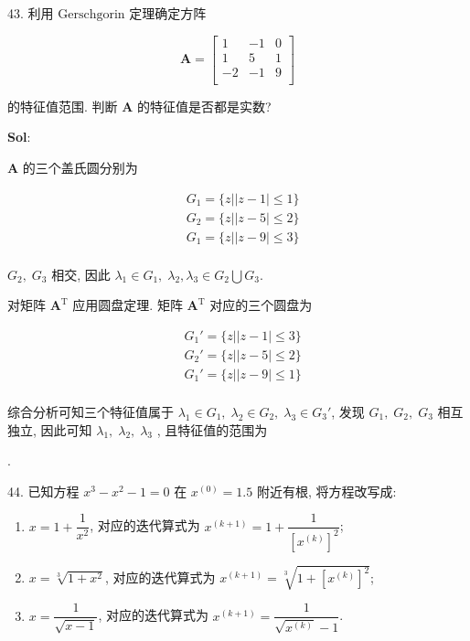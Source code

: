 

43. 利用 $\text{Gerschgorin}$ 定理确定方阵

$$
\textbf{A}=\begin{bmatrix}
    1&-1&0\\
    1&5&1\\
    -2&-1&9\\
\end{bmatrix}
$$

的特征值范围. 判断 $\textbf{A}$ 的特征值是否都是实数?

\textbf{Sol}:  

$\textbf{A}$ 的三个盖氏圆分别为

$$
\begin{aligned}
    &G_1=\{z|\mid z-1\mid \leqslant 1\}\\
    &G_2=\{z|\mid z-5\mid \leqslant 2\}\\
    &G_1=\{z|\mid z-9\mid \leqslant 3\}\\
\end{aligned}
$$

$G_2,\;G_3$ 相交, 因此 $\lambda_1\in G_1,\;\lambda_2,\lambda_3\in G_2\bigcup G_3$.

对矩阵 $\textbf{A}^{\text{T}}$ 应用圆盘定理. 矩阵 $\textbf{A}^{\text{T}}$ 对应的三个圆盘为

$$
\begin{aligned}
    &G_1'=\{z|\mid z-1\mid \leqslant 3\}\\
    &G_2'=\{z|\mid z-5\mid \leqslant 2\}\\
    &G_1'=\{z|\mid z-9\mid \leqslant 1\}\\
\end{aligned}
$$

综合分析可知三个特征值属于 $\lambda_1\in G_1,\;\lambda_2\in G_2,\;\lambda_3\in G_3'$, 
发现 $G_1,\;G_2,\;G_3$ 相互独立, 因此可知 $\lambda_1,\;\lambda_2,\;\lambda_3$ , 且特征值的范围为

.

\vspace{12pt}


44. 已知方程 $x^3-x^2-1=0$ 在 $x^{(0)}=1.5$ 附近有根, 将方程改写成:

\begin{enumerate}[(1)]
    \item $x=1+\dfrac{1}{x^2}$, 对应的迭代算式为 $x^{(k+1)}=1+\dfrac{1}{[x^{(k)}]^2}$;
    \item $x=\sqrt[3]{1+x^2}$, 对应的迭代算式为 $x^{(k+1)}=\sqrt[3]{1+[x^{(k)}]^2}$;
    \item $x=\dfrac{1}{\sqrt{x-1}}$, 对应的迭代算式为 $x^{(k+1)}=\dfrac{1}{\sqrt{x^{(k)}}-1}$.
\end{enumerate}

